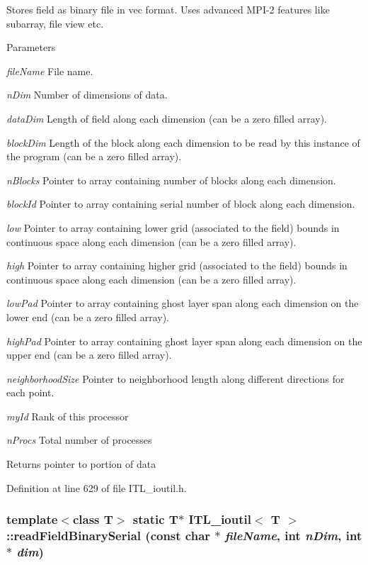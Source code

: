 Stores field as binary file in vec format. Uses advanced MPI-\/2 features like subarray, file view etc. 
\begin{DoxyParams}{Parameters}
\item[{\em fileName}]File name. \item[{\em nDim}]Number of dimensions of data. \item[{\em dataDim}]Length of field along each dimension (can be a zero filled array). \item[{\em blockDim}]Length of the block along each dimension to be read by this instance of the program (can be a zero filled array). \item[{\em nBlocks}]Pointer to array containing number of blocks along each dimension. \item[{\em blockId}]Pointer to array containing serial number of block along each dimension. \item[{\em low}]Pointer to array containing lower grid (associated to the field) bounds in continuous space along each dimension (can be a zero filled array). \item[{\em high}]Pointer to array containing higher grid (associated to the field) bounds in continuous space along each dimension (can be a zero filled array). \item[{\em lowPad}]Pointer to array containing ghost layer span along each dimension on the lower end (can be a zero filled array). \item[{\em highPad}]Pointer to array containing ghost layer span along each dimension on the upper end (can be a zero filled array). \item[{\em neighborhoodSize}]Pointer to neighborhood length along different directions for each point. \item[{\em myId}]Rank of this processor \item[{\em nProcs}]Total number of processes \end{DoxyParams}
\begin{DoxyReturn}{Returns}
pointer to portion of data 
\end{DoxyReturn}


Definition at line 629 of file ITL\_\-ioutil.h.

\hypertarget{classITL__ioutil_a07684c0af4216162b822f5f66554226f}{
\subsubsection[{readFieldBinarySerial}]{\setlength{\rightskip}{0pt plus 5cm}template$<$class T$>$ static T$\ast$ {\bf ITL\_\-ioutil}$<$ T $>$::readFieldBinarySerial (const char $\ast$ {\em fileName}, \/  int {\em nDim}, \/  int $\ast$ {\em dim})}}
\label{classITL__ioutil_a07684c0af4216162b822f5f66554226f}


